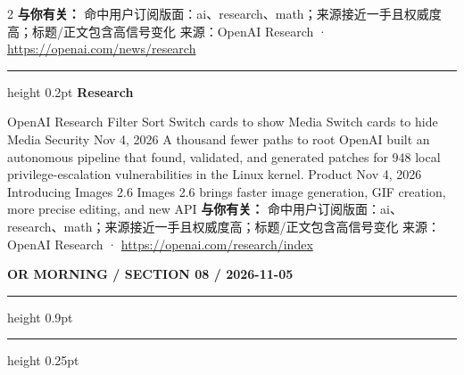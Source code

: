 \documentclass[10.5pt]{ctexart}
\begin{document}
\begin{multicols}{2}
\textbf{与你有关：} 命中用户订阅版面：ai、research、math；来源接近一手且权威度高；标题/正文包含高信号变化
{\footnotesize\color{ormuted} 来源：OpenAI Research · \url{https://openai.com/news/research}}
\vspace{2mm}
\hrule height 0.2pt
\vspace{2mm}
{\large\bfseries Research}\par
OpenAI Research Filter Sort Switch cards to show Media Switch cards to hide Media Security Nov 4, 2026 A thousand fewer paths to root OpenAI built an autonomous pipeline that found, validated, and generated patches for 948 local privilege-escalation vulnerabilities in the Linux kernel. Product Nov 4, 2026 Introducing Images 2.6 Images 2.6 brings faster image generation, GIF creation, more precise editing, and new API
\textbf{与你有关：} 命中用户订阅版面：ai、research、math；来源接近一手且权威度高；标题/正文包含高信号变化
{\footnotesize\color{ormuted} 来源：OpenAI Research · \url{https://openai.com/research/index}}
\end{multicols}
\newpage
{\small\bfseries OR MORNING / SECTION 08 / 2026-11-05}
\vspace{2mm}
\hrule height 0.9pt
\vspace{1.5mm}
\hrule height 0.25pt
\vspace{4mm}
\end{document}
